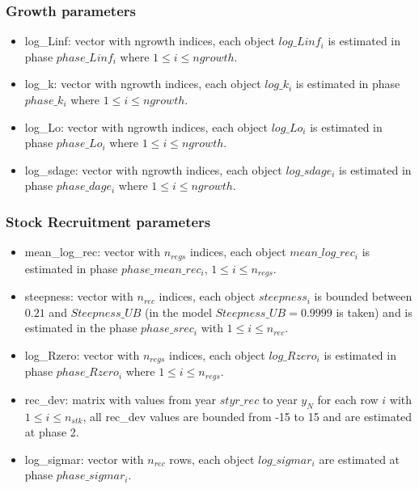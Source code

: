 \documentclass{article}
\begin{document}
\subsubsection{Growth parameters}
\begin{itemize}
   
    \item log\_Linf: vector with ngrowth indices, each object $log\_Linf_i$ is estimated in phase $phase\_Linf_i$ where $1\leq i \leq ngrowth$. 
   
    
    
    \item log\_k: vector with ngrowth indices, each object $log\_k_i$ is estimated in phase $phase\_k_i$ where $1\leq i \leq ngrowth$.
   
    
   
    \item log\_Lo: vector with ngrowth indices, each object $log\_Lo_i$ is estimated in phase $phase\_Lo_i$ where $1 \leq i \leq ngrowth$.
   
    
   
    \item log\_sdage: vector with ngrowth indices, each object $log\_sdage_i$ is estimated in phase $phase\_dage_i$ where $1 \leq i \leq ngrowth$.
    
    \end{itemize}
\subsubsection{Stock Recruitment parameters}
\begin{itemize}
    
    \item mean\_log\_rec:
    vector with $n_{regs}$ indices, each object $mean\_log\_rec_i$ is estimated in phase $phase\_mean\_rec_i$, $1 \leq i \leq n_{regs}$. 
    
    \item steepness: vector with $n_{rec}$ indices, each object $steepness_i$ is bounded between $0.21$ and $Steepness\_UB$ (in the model $Steepness\_UB=0.9999$ is taken) and is estimated in the phase $phase\_srec_i$ with $1\leq i \leq n_{rec}$.
    
   
    
    \item log\_Rzero: vector with $n_{regs}$ indices, each object $log\_Rzero_i$ is estimated in phase $phase\_Rzero_i$ where $1 \leq i \leq n_{regs}$.
    
    \item rec\_dev: matrix with values from year $styr\_rec$ to year $y_N$ for each row $i$ with $1\leq i \leq n_{stk}$, all rec\_dev values are bounded from -15 to 15 and are estimated at phase 2.

    
    \item log\_sigmar: vector with $n_{rec}$ rows, each object $log\_sigmar_i$  are estimated at phase $phase\_sigmar_i$.
\end{itemize}
\end{document}
